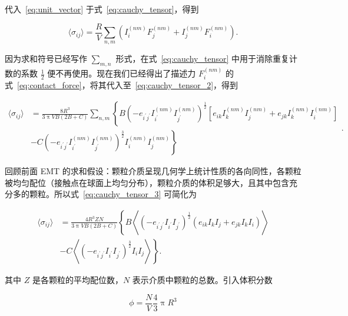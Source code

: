 代入~\eqref{eq:unit_vector} 于式~\eqref{eq:cauchy_tensor}，得到

\begin{equation}
  \langle\sigma_{ij}\rangle = \frac{R}{V}\sum_{n,m}\left(I_{i}^{(nm)}F_{j}^{(nm)} + I_{j}^{(nm)}F_{i}^{(nm)}\right)\label{eq:cauchy_tensor_2}.
\end{equation}

因为求和符号已经写作 $\sum_{m,n}$ 形式，在式~\eqref{eq:cauchy_tensor} 中用于消除重复计数的系数 $\frac{1}{2}$ 便不再使用。现在我们已经得出了描述力 $F_{i}^{(nm)}$ 的式~\eqref{eq:contact_force}，将其代入至~\eqref{eq:cauchy_tensor_2}，得到

\begin{equation}
  \begin{aligned}
    \langle\sigma_{ij}\rangle &= \frac{8R^{3}}{3\uppi VB(2B+C)}\sum_{n,m}\left\{B\left(-e_{i^{\prime}j^{\prime}}I_{i^{\prime}}^{(nm)}I_{j^{\prime}}^{(nm)}\right)^{\frac{1}{2}}\left[e_{ik}I_{k}^{(nm)}I_{j}^{(nm)} + e_{jk}I_{k}^{(nm)}I_{i}^{(nm)}\right]\right.\\
    &-\left. C\left(-e_{i^{\prime}j^{\prime}}I_{i^{\prime}}^{(nm)}I_{j^{\prime}}^{(nm)}\right)^{\frac{3}{2}}I_{i}^{(nm)}I_{j}^{(nm)}\right\}
  \end{aligned}\label{eq:cauchy_tensor_3}.
\end{equation}

回顾前面 EMT 的求和假设：颗粒介质呈现几何学上统计性质的各向同性，各颗粒被均匀配位（接触点在球面上均匀分布），颗粒介质的体积足够大，且其中包含充分多的颗粒。所以式~\eqref{eq:cauchy_tensor_3} 可简化为

\begin{equation}
  \begin{aligned}
  \langle\sigma_{ij}\rangle &= \frac{4R^{3}ZN}{3\uppi VB(2B+C)}\left\{B\left\langle(-e_{i^{\prime}j^{\prime}}I_{i^{\prime}}I_{j^{\prime}})^{\frac{1}{2}}(e_{ik}I_{k}I_{j} + e_{jk}I_{k}I_{i})\right\rangle\right.\\
  &-\left.C\left\langle(-e_{i^{\prime}j^{\prime}}I_{i^{\prime}}I_{j^{\prime}})^{\frac{3}{2}}I_{i}I_{j}\right\rangle\right\}.
  \end{aligned}\label{eq:cauchy_tensor_4}
\end{equation}

其中 $Z$ 是各颗粒的平均配位数，$N$ 表示介质中颗粒的总数。引入体积分数

\begin{equation}
  \phi = \frac{N}{V}\frac{4}{3}\uppi R^3
\end{equation}

